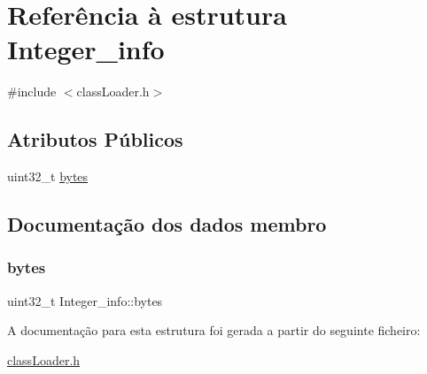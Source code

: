\hypertarget{struct_integer__info}{}\section{Referência à estrutura Integer\+\_\+info}
\label{struct_integer__info}


{\ttfamily \#include $<$class\+Loader.\+h$>$}

\subsection*{Atributos Públicos}
\begin{DoxyCompactItemize}
\item 
uint32\+\_\+t \hyperlink{struct_integer__info_a442ed49550487239081da525ffd31d20}{bytes}
\end{DoxyCompactItemize}


\subsection{Documentação dos dados membro}
\hypertarget{struct_integer__info_a442ed49550487239081da525ffd31d20}{}\label{struct_integer__info_a442ed49550487239081da525ffd31d20} 
\subsubsection{\texorpdfstring{bytes}{bytes}}
{\footnotesize\ttfamily uint32\+\_\+t Integer\+\_\+info\+::bytes}



A documentação para esta estrutura foi gerada a partir do seguinte ficheiro\+:\begin{DoxyCompactItemize}
\item 
\hyperlink{class_loader_8h}{class\+Loader.\+h}\end{DoxyCompactItemize}
